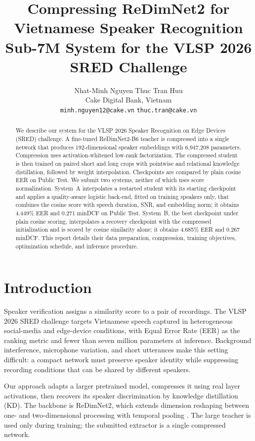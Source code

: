 \documentclass[11pt]{article}
\title{Compressing ReDimNet2 for Vietnamese Speaker Recognition\\ Sub-7M System for the VLSP 2026 SRED Challenge}
\author{Nhat-Minh Nguyen \qquad Thuc Tran Huu \\
Cake Digital Bank, Vietnam \\
\texttt{minh.nguyen12@cake.vn} \quad \texttt{thuc.tran@cake.vn}}
\begin{document}
\maketitle
\begin{abstract}
We describe our system for the VLSP 2026 Speaker Recognition on Edge Devices (SRED) challenge. A fine-tuned ReDimNet2-B6 teacher is compressed into a single network that produces 192-dimensional speaker embeddings with 6,947,208 parameters. Compression uses activation-whitened low-rank factorization. The compressed student is then trained on paired short and long crops with pointwise and relational knowledge distillation, followed by weight interpolation. Checkpoints are compared by plain cosine EER on Public Test. We submit two systems, neither of which uses score normalization. System~A interpolates a restarted student with its starting checkpoint and applies a quality-aware logistic back-end, fitted on training speakers only, that combines the cosine score with speech duration, SNR, and embedding norm; it obtains 4.449\% EER and 0.271 minDCF on Public Test. System~B, the best checkpoint under plain cosine scoring, interpolates a recovery checkpoint with the compressed initialization and is scored by cosine similarity alone; it obtains 4.685\% EER and 0.267 minDCF. This report details their data preparation, compression, training objectives, optimization schedule, and inference procedure.
\end{abstract}

\section{Introduction}
Speaker verification assigns a similarity score to a pair of recordings. The VLSP 2026 SRED challenge targets Vietnamese speech captured in heterogeneous social-media and edge-device conditions, with Equal Error Rate (EER) as the ranking metric and fewer than seven million parameters at inference. Background interference, microphone variation, and short utterances make this setting difficult: a compact network must preserve speaker identity while suppressing recording conditions that can be shared by different speakers.

Our approach adapts a larger pretrained model, compresses it using real layer activations, then recovers its speaker discrimination by knowledge distillation (KD). The backbone is ReDimNet2, which extends dimension reshaping between one- and two-dimensional processing with temporal pooling \citep{yakovlev2026redimnet2}. The large teacher is used only during training; the submitted extractor is a single compressed network.
\end{document}
